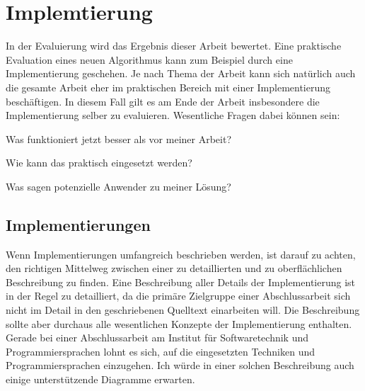 
\chapter{Implemtierung}
\label{chapter-evaluation}

In der Evaluierung wird das Ergebnis dieser Arbeit bewertet. Eine praktische Evaluation eines neuen Algorithmus kann zum Beispiel durch eine Implementierung geschehen. Je nach Thema der Arbeit kann sich natürlich auch die gesamte Arbeit eher im praktischen Bereich mit einer Implementierung beschäftigen. In diesem Fall gilt es am Ende der Arbeit insbesondere die Implementierung selber zu evaluieren. Wesentliche Fragen dabei können sein:
\begin{compactitem}[--]
  \item Was funktioniert jetzt besser als vor meiner Arbeit?
  \item Wie kann das praktisch eingesetzt werden?
  \item Was sagen potenzielle Anwender zu meiner Lösung?
\end{compactitem}

\section{Implementierungen}

Wenn Implementierungen umfangreich beschrieben werden, ist darauf zu achten, den richtigen Mittelweg zwischen einer zu detaillierten und zu oberflächlichen Beschreibung zu finden. Eine Beschreibung aller Details der Implementierung ist in der Regel zu detailliert, da die primäre Zielgruppe einer Abschlussarbeit sich nicht im Detail in den geschriebenen Quelltext einarbeiten will. Die Beschreibung sollte aber durchaus alle wesentlichen Konzepte der Implementierung enthalten. Gerade bei einer Abschlussarbeit am Institut für Softwaretechnik und Programmiersprachen lohnt es sich, auf die eingesetzten Techniken und Programmiersprachen einzugehen. Ich würde in einer solchen Beschreibung auch einige unterstützende Diagramme erwarten.

